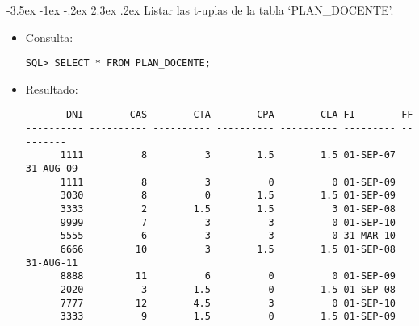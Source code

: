 \documentclass[11pt]{report}
\makeatletter
\renewcommand\chapter{\@startsection{chapter}{0}{\z@}%
    {-3.5ex \@plus -1ex \@minus -.2ex}%
    {2.3ex \@plus.2ex}%
    {\normalfont\Large\bfseries}}
\makeatother
\begin{document}
\newpage

\chapter{Listar las t-uplas de la tabla ‘PLAN\_DOCENTE’.}
\begin{itemize}
  \item Consulta:
  \begin{verbatim}
SQL> SELECT * FROM PLAN_DOCENTE;
  \end{verbatim}
  \item{Resultado:}
  \begin{verbatim}
       DNI        CAS        CTA        CPA        CLA FI        FF                                                                                                                                     
---------- ---------- ---------- ---------- ---------- --------- ---------                                                                                                                              
      1111          8          3        1.5        1.5 01-SEP-07 31-AUG-09                                                                                                                              
      1111          8          3          0          0 01-SEP-09                                                                                                                                        
      3030          8          0        1.5        1.5 01-SEP-09                                                                                                                                        
      3333          2        1.5        1.5          3 01-SEP-08                                                                                                                                        
      9999          7          3          3          0 01-SEP-10                                                                                                                                        
      5555          6          3          3          0 31-MAR-10                                                                                                                                        
      6666         10          3        1.5        1.5 01-SEP-08 31-AUG-11                                                                                                                              
      8888         11          6          0          0 01-SEP-09                                                                                                                                        
      2020          3        1.5          0        1.5 01-SEP-08                                                                                                                                        
      7777         12        4.5          3          0 01-SEP-10                                                                                                                                        
      3333          9        1.5          0        1.5 01-SEP-09                                                                                                                                        


\end{verbatim}
\end{itemize}
\end{document}
